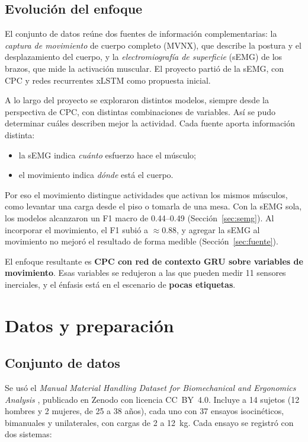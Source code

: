 \documentclass[letterpaper,11pt]{article}
\begin{document}
\subsection{Evolución del enfoque}
El conjunto de datos reúne dos fuentes de información complementarias: la \emph{captura de movimiento} de cuerpo completo (MVNX), que describe la postura y el desplazamiento del cuerpo, y la \emph{electromiografía de superficie} (sEMG) de los brazos, que mide la activación muscular. El proyecto partió de la sEMG, con CPC y redes recurrentes xLSTM \parencite{beck2024} como propuesta inicial.

A lo largo del proyecto se exploraron distintos modelos, siempre desde la perspectiva de CPC, con distintas combinaciones de variables. Así se pudo determinar cuáles describen mejor la actividad. Cada fuente aporta información distinta:
\begin{itemize}
  \item la sEMG indica \emph{cuánto} esfuerzo hace el músculo;
  \item el movimiento indica \emph{dónde} está el cuerpo.
\end{itemize}
Por eso el movimiento distingue actividades que activan los mismos músculos, como levantar una carga desde el piso o tomarla de una mesa. Con la sEMG sola, los modelos alcanzaron un F1 macro de 0.44--0.49 (Sección~\ref{sec:semg}). Al incorporar el movimiento, el F1 subió a $\approx 0.88$, y agregar la sEMG al movimiento no mejoró el resultado de forma medible (Sección~\ref{sec:fuente}).

El enfoque resultante es \textbf{CPC con red de contexto GRU sobre variables de movimiento}. Esas variables se redujeron a las que pueden medir 11 sensores inerciales, y el énfasis está en el escenario de \textbf{pocas etiquetas}.

\section{Datos y preparación}

\subsection{Conjunto de datos}
Se usó el \emph{Manual Material Handling Dataset for Biomechanical and Ergonomics Analysis} \parencite{bassani2021dataset}, publicado en Zenodo con licencia CC~BY~4.0. Incluye a 14 sujetos (12 hombres y 2 mujeres, de 25 a 38 años), cada uno con 37 ensayos isocinéticos, bimanuales y unilaterales, con cargas de 2 a 12~kg. Cada ensayo se registró con dos sistemas:
\end{document}
